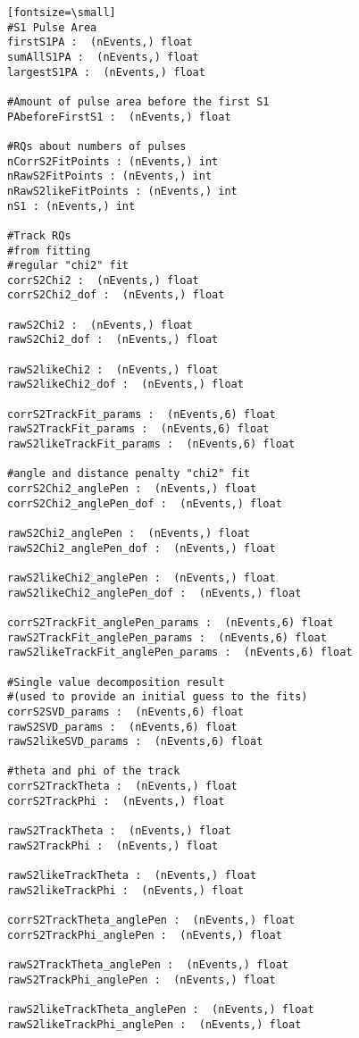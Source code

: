\begin{verbatim}[fontsize=\small]
#S1 Pulse Area
firstS1PA :  (nEvents,) float
sumAllS1PA :  (nEvents,) float
largestS1PA :  (nEvents,) float

#Amount of pulse area before the first S1
PAbeforeFirstS1 :  (nEvents,) float

#RQs about numbers of pulses
nCorrS2FitPoints : (nEvents,) int 
nRawS2FitPoints : (nEvents,) int 
nRawS2likeFitPoints : (nEvents,) int 
nS1 : (nEvents,) int

#Track RQs
#from fitting
#regular "chi2" fit
corrS2Chi2 :  (nEvents,) float
corrS2Chi2_dof :  (nEvents,) float

rawS2Chi2 :  (nEvents,) float
rawS2Chi2_dof :  (nEvents,) float

rawS2likeChi2 :  (nEvents,) float
rawS2likeChi2_dof :  (nEvents,) float

corrS2TrackFit_params :  (nEvents,6) float
rawS2TrackFit_params :  (nEvents,6) float
rawS2likeTrackFit_params :  (nEvents,6) float

#angle and distance penalty "chi2" fit
corrS2Chi2_anglePen :  (nEvents,) float
corrS2Chi2_anglePen_dof :  (nEvents,) float

rawS2Chi2_anglePen :  (nEvents,) float
rawS2Chi2_anglePen_dof :  (nEvents,) float

rawS2likeChi2_anglePen :  (nEvents,) float
rawS2likeChi2_anglePen_dof :  (nEvents,) float

corrS2TrackFit_anglePen_params :  (nEvents,6) float
rawS2TrackFit_anglePen_params :  (nEvents,6) float
rawS2likeTrackFit_anglePen_params :  (nEvents,6) float     

#Single value decomposition result 
#(used to provide an initial guess to the fits)
corrS2SVD_params :  (nEvents,6) float
rawS2SVD_params :  (nEvents,6) float
rawS2likeSVD_params :  (nEvents,6) float

#theta and phi of the track
corrS2TrackTheta :  (nEvents,) float 
corrS2TrackPhi :  (nEvents,) float 

rawS2TrackTheta :  (nEvents,) float 
rawS2TrackPhi :  (nEvents,) float

rawS2likeTrackTheta :  (nEvents,) float 
rawS2likeTrackPhi :  (nEvents,) float

corrS2TrackTheta_anglePen :  (nEvents,) float 
corrS2TrackPhi_anglePen :  (nEvents,) float 

rawS2TrackTheta_anglePen :  (nEvents,) float 
rawS2TrackPhi_anglePen :  (nEvents,) float 

rawS2likeTrackTheta_anglePen :  (nEvents,) float 
rawS2likeTrackPhi_anglePen :  (nEvents,) float 


\end{verbatim}

